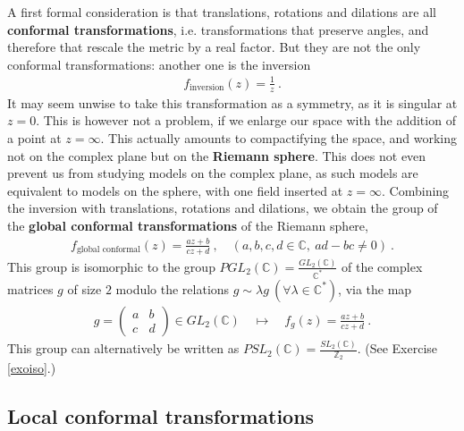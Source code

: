 \documentclass[12pt, a4paper, notitlepage, twoside]{report}
\numberwithin{equation}{section}
\theoremstyle{break}
\begin{document}
A first formal consideration is that translations, rotations and dilations are all \textbf{\boldmath conformal transformations}, i.e. transformations that preserve angles, and therefore that rescale the metric by a real factor.
But they are not the only conformal transformations: another one is the inversion
\begin{align}
 f_\text{inversion}(z) = \frac{1}{z}\ .
\end{align}
It may seem unwise to take this transformation as a symmetry, as it is singular at $z=0$.
This is however not a problem, if we enlarge our space with the addition of a point at $z=\infty$.
This actually amounts to compactifying the space, and working not on the complex plane but on the \textbf{\boldmath Riemann sphere}.
This does not even prevent us from studying models on the complex plane, as such models are equivalent to models on the sphere, with one field inserted at $z=\infty$.
Combining the inversion with translations, rotations and dilations, we obtain the group of the \textbf{\boldmath global conformal transformations} of the Riemann sphere,
\begin{align}
 \boxed{f_\text{global conformal}(z)  = \frac{az+b}{cz+d}}\ , \quad (a,b,c,d\in\mathbb{C},\ ad-bc\neq 0)\ .
\end{align}
This group is isomorphic to the group $PGL_2({\mathbb{C}})=\frac{GL_2({\mathbb{C}})}{\mathbb{C}^*}$ of the complex matrices $g$ of size $2$ modulo the relations $g\sim \lambda g\ (\forall \lambda\in\mathbb{C}^*)$, via the map
\begin{align}
 g = \left(\begin{array}{cc} a & b \\ c & d \end{array}\right) \in GL_2({\mathbb{C}}) \quad \longmapsto\quad f_g(z) = \frac{az+b}{cz+d}\ .
\label{gisl}
\end{align}
This group can alternatively be written as $PSL_2(\mathbb{C}) = \frac{SL_2(\mathbb{C})}{\mathbb{Z}_2}$.
(See Exercise \ref{exoiso}.) 


\subsection{Local conformal transformations \label{secloc}}
\end{document}
